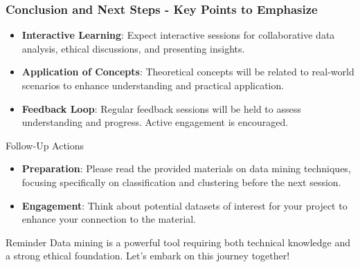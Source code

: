 \documentclass[aspectratio=169]{beamer}
\begin{document}
\begin{frame}[fragile]
    \frametitle{Conclusion and Next Steps - Key Points to Emphasize}
    \begin{itemize}
        \item \textbf{Interactive Learning}: Expect interactive sessions for collaborative data analysis, ethical discussions, and presenting insights.
        \item \textbf{Application of Concepts}: Theoretical concepts will be related to real-world scenarios to enhance understanding and practical application.
        \item \textbf{Feedback Loop}: Regular feedback sessions will be held to assess understanding and progress. Active engagement is encouraged.
    \end{itemize}

    \begin{block}{Follow-Up Actions}
        \begin{itemize}
            \item \textbf{Preparation}: Please read the provided materials on data mining techniques, focusing specifically on classification and clustering before the next session.
            \item \textbf{Engagement}: Think about potential datasets of interest for your project to enhance your connection to the material.
        \end{itemize}
    \end{block}
    
    \begin{block}{Reminder}
        Data mining is a powerful tool requiring both technical knowledge and a strong ethical foundation. Let’s embark on this journey together!
    \end{block}
\end{frame}
\end{document}
